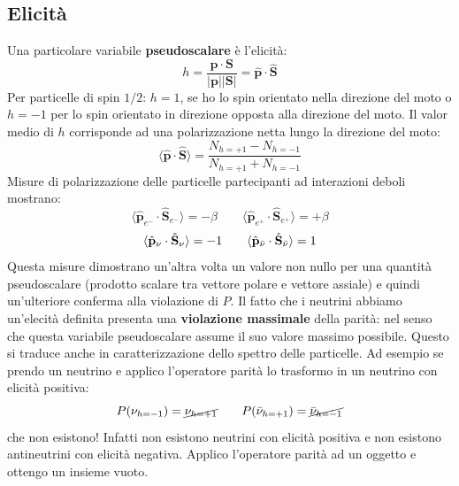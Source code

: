 \subsection{Elicità}
Una particolare variabile \textbf{pseudoscalare} è l'elicità:
\begin{equation*}
    h=\frac{\mathbf{p}\cdot\mathbf{S}}{|\mathbf{p}||\mathbf{S}|}=\hat{\mathbf{p}}\cdot\hat{\mathbf{S}}
\end{equation*}
Per particelle di spin $1/2$: $h=1$, se ho lo spin orientato nella direzione del moto o $h=-1$ per lo spin orientato in direzione opposta alla direzione del moto. Il valor medio di $h$ corrisponde ad una polarizzazione netta lungo la direzione del moto:
\begin{equation*}
    \langle \hat{\mathbf{p}}\cdot\hat{\mathbf{S}}\rangle =\frac{N_{h=+1}-N_{h=-1}}{N_{h=+1}+N_{h=-1}}
\end{equation*}
Misure di polarizzazione delle particelle partecipanti ad interazioni deboli mostrano:
\begin{equation*}
    \langle \hat{\mathbf{p}}_{e^-}\cdot\hat{\mathbf{S}}_{e^-}\rangle =-\beta \qquad \langle\hat{\mathbf{p}}_{e^+}\cdot\hat{\mathbf{S}}_{e^+}\rangle =+\beta
\end{equation*}
\begin{equation*}
    \langle \hat{\mathbf{p}}_{\nu}\cdot\hat{\mathbf{S}}_{\nu}\rangle =-1 \qquad \langle\hat{\mathbf{p}}_{\Bar{\nu}}\cdot\hat{\mathbf{S}}_{\Bar{\nu}}\rangle =1
\end{equation*}
Questa misure dimostrano un'altra volta un valore non nullo per una quantità pseudoscalare (prodotto scalare tra vettore polare e vettore assiale) e quindi un'ulteriore conferma alla violazione di $P$. Il fatto che i neutrini abbiamo un'elecità definita presenta una \textbf{violazione massimale} della parità: nel senso che questa variabile pseudoscalare assume il suo valore massimo possibile. Questo si traduce anche in  caratterizzazione dello spettro delle particelle. Ad esempio se prendo un neutrino e applico l'operatore parità lo trasformo in un neutrino con elicità positiva:
\begin{equation*}
    P(\nu_{h=-1})=\cancel{\nu_{h=+1}} \qquad P(\Bar{\nu}_{h=+1})=\cancel{\Bar{\nu}_{h=-1}}
\end{equation*}
che non esistono! Infatti non esistono neutrini con elicità positiva e non esistono antineutrini con elicità negativa. Applico l'operatore parità ad un oggetto e ottengo un insieme vuoto.
